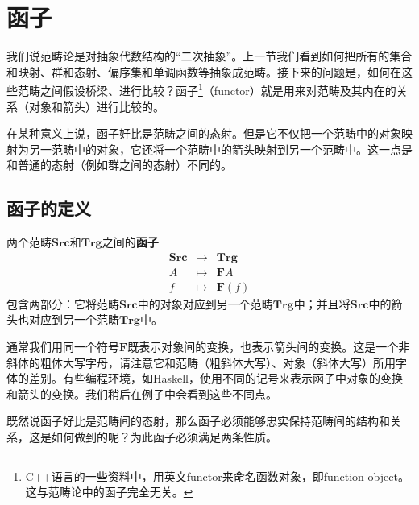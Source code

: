 \documentclass{article}
\begin{document}
\begin{Exercise}
\end{Exercise}

\section{函子}
我们说范畴论是对抽象代数结构的“二次抽象”。上一节我们看到如何把所有的集合和映射、群和态射、偏序集和单调函数等抽象成范畴。接下来的问题是，如何在这些范畴之间假设桥梁、进行比较？函子\footnote{C++语言的一些资料中，用英文functor来命名函数对象，即function object。这与范畴论中的函子完全无关。}（functor）就是用来对范畴及其内在的关系（对象和箭头）进行比较的。

在某种意义上说，函子好比是范畴之间的态射。但是它不仅把一个范畴中的对象映射为另一范畴中的对象，它还将一个范畴中的箭头映射到另一个范畴中。这一点是和普通的态射（例如群之间的态射）不同的。

\subsection{函子的定义}

\begin{definition}
两个范畴$\pmb{Src}$和$\pmb{Trg}$之间的\textbf{函子}
\[
\begin{array}{rcl}
\pmb{Src} & \longrightarrow & \pmb{Trg} \\
A & \longmapsto & \mathbf{F}A \\
f & \longmapsto & \mathbf{F}(f)
\end{array}
\]
包含两部分：它将范畴$\pmb{Src}$中的对象对应到另一个范畴$\pmb{Trg}$中；并且将$\pmb{Src}$中的箭头也对应到另一个范畴$\pmb{Trg}$中。
\end{definition}

通常我们用同一个符号$\mathbf{F}$既表示对象间的变换，也表示箭头间的变换。这是一个非斜体的粗体大写字母，请注意它和范畴（粗斜体大写）、对象（斜体大写）所用字体的差别。有些编程环境，如Haskell，使用不同的记号来表示函子中对象的变换和箭头的变换。我们稍后在例子中会看到这些不同点。

既然说函子好比是范畴间的态射，那么函子必须能够忠实保持范畴间的结构和关系，这是如何做到的呢？为此函子必须满足两条性质。
\end{document}
